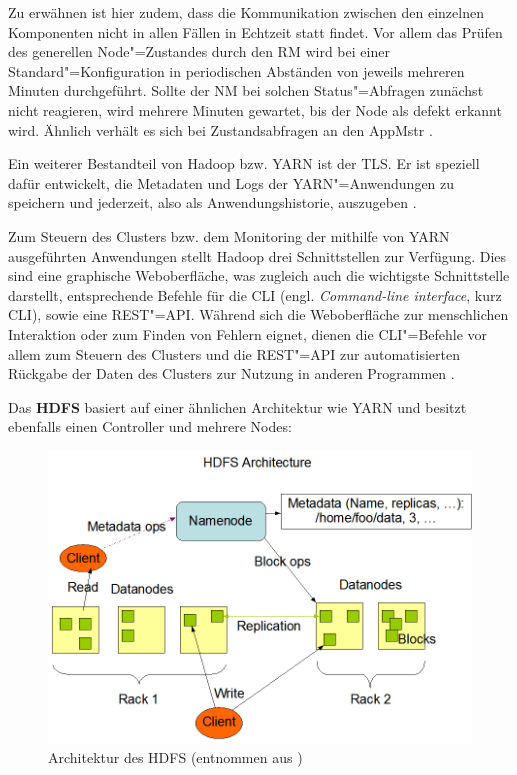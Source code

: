 Zu erwähnen ist hier zudem, dass die Kommunikation zwischen den einzelnen Komponenten nicht in allen Fällen in Echtzeit statt findet.
Vor allem das Prüfen des generellen Node"=Zustandes durch den \ac{RM} wird bei einer Standard"=Konfiguration in periodischen Abständen von jeweils mehreren Minuten durchgeführt.
Sollte der \ac{NM} bei solchen Status"=Abfragen zunächst nicht reagieren, wird mehrere Minuten gewartet, bis der Node als defekt erkannt wird.
Ähnlich verhält es sich bei Zustandsabfragen an den \ac{AppMstr} \cite{HadoopYarnConfig271}.

Ein weiterer Bestandteil von Hadoop bzw. \ac{YARN} ist der \ac{TLS}.
Er ist speziell dafür entwickelt, die Metadaten und Logs der \ac{YARN}"=Anwendungen zu speichern und jederzeit, also als Anwendungshistorie, auszugeben \cite{HadoopYarnTlServer271}.

Zum Steuern des Clusters bzw. dem Monitoring der mithilfe von \ac{YARN} ausgeführten Anwendungen stellt Hadoop drei Schnittstellen zur Verfügung.
Dies sind eine graphische Weboberfläche, was zugleich auch die wichtigste Schnittstelle darstellt, entsprechende Befehle für die \acl{CLI} (engl. \emph{Command-line interface}, kurz \acs{CLI}), sowie eine REST"=API.
Während sich die Weboberfläche zur menschlichen Interaktion oder zum Finden von Fehlern eignet, dienen die \ac{CLI}"=Befehle vor allem zum Steuern des Clusters und die REST"=API zur automatisierten Rückgabe der Daten des Clusters zur Nutzung in anderen Programmen \cite{HadoopClusterSetup271,HadoopYarnCmds271,HadoopRmApi271,HadoopNmApi271}.

Das \textbf{\ac{HDFS}} basiert auf einer ähnlichen Architektur wie \ac{YARN} und besitzt ebenfalls einen Controller und mehrere Nodes:

\begin{figure}[h]
    \includegraphics{./resources/hdfsarchitecture.png}
    \caption[Architektur des HDFS]
    {Architektur des \acs{HDFS} (entnommen aus \cite{HadoopHdfsDesc271})}
    \label{fig:hdfsarch}
\end{figure}

